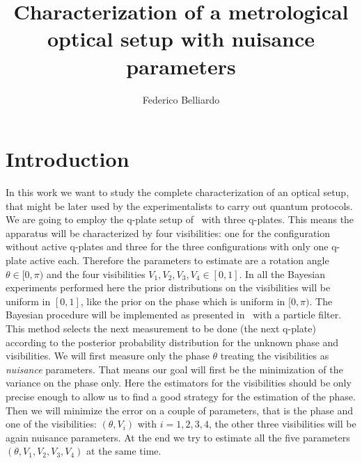 \documentclass[aps, pra, 10pt, twocolumn, superscriptaddress,floatfix]{revtex4-1}
\begin{document}
%
\title{Characterization of a metrological optical setup with nuisance parameters} 
%
\author{Federico Belliardo}

\maketitle


\section{Introduction}
\label{sec:introduction}
%
In this work we want to study the complete characterization of an optical setup, that might be later used by the experimentalists to carry out quantum protocols. We are going to employ the q-plate setup of~\cite{Cimini2021} with three q-plates. This means the apparatus will be characterized by four visibilities: one for the configuration without active q-plates and three for the three configurations with only one q-plate active each. Therefore the parameters to estimate are a rotation angle $\theta \in [0, \pi)$ and the four visibilities $V_1, V_2, V_3, V_4 \in [0, 1]$. In all the Bayesian experiments performed here the prior distributions on the visibilities will be uniform in $[0, 1]$, like the prior on the phase which is uniform in $[0, \pi)$. The Bayesian procedure will be implemented as presented in~\cite{Granade2012} with a particle filter. This method selects the next measurement to be done (the next q-plate) according to the posterior probability distribution for the unknown phase and visibilities. We will first measure only the phase $\theta$ treating the visibilities as \textit{nuisance} parameters. That means our goal will first be the minimization of the variance on the phase only. Here the estimators for the visibilities should be only precise enough to allow us to find a good strategy for the estimation of the phase. Then we will minimize the error on a couple of parameters, that is the phase and one of the visibilities: $(\theta, V_i)$ with $i=1, 2, 3, 4$, the other three visibilities will be again nuisance parameters. At the end we try to estimate all the five parameters $(\theta, V_1, V_2, V_3, V_4)$ at the same time. 
\end{document}
